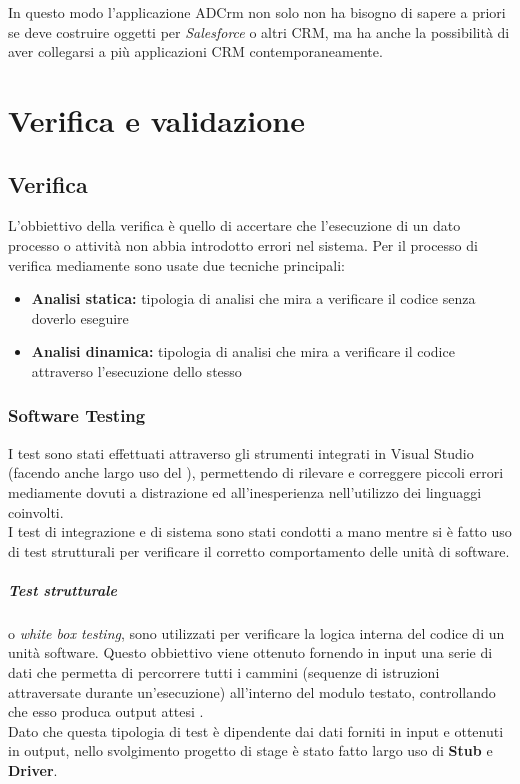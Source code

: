 \documentclass[12pt,a4paper,twoside,openany,english]{book}
\begin{document}
In questo modo l'applicazione ADCrm non solo non ha bisogno di sapere a priori se deve costruire oggetti per \textit{Salesforce} o altri \gls{CRM}, ma ha anche la possibilità di aver collegarsi a più applicazioni \gls{CRM} contemporaneamente.





\chapter{Verifica e validazione}\label{verifica_validazione}
\section{Verifica}
L'obbiettivo della verifica è quello di accertare che l'esecuzione di un dato processo o attività non abbia introdotto errori nel sistema.
Per il processo di verifica mediamente sono usate due tecniche principali:
\begin{itemize}
	\item \textbf{Analisi statica:} tipologia di analisi che mira a verificare il codice senza doverlo eseguire
	\item \textbf{Analisi dinamica:} tipologia di analisi che mira a verificare il codice attraverso l'esecuzione dello stesso
\end{itemize}

\subsection{Software Testing}
I test sono stati effettuati attraverso gli strumenti integrati in Visual Studio (facendo anche largo uso del \textit{}), permettendo di rilevare e correggere piccoli errori mediamente dovuti a distrazione ed all'inesperienza nell'utilizzo dei linguaggi coinvolti.\\
I test di integrazione e di sistema sono stati condotti a mano mentre si è fatto uso di test strutturali per verificare il corretto comportamento delle unità di software.

\paragraph{Test strutturale}
o \textit{white box testing}, sono utilizzati per verificare la logica interna del codice di un unità software. Questo obbiettivo viene ottenuto fornendo in input una serie di dati che permetta di percorrere tutti i cammini (sequenze di istruzioni attraversate durante un'esecuzione) all'interno del modulo testato, controllando che esso produca output attesi .\\
Dato che questa tipologia di test è dipendente dai dati forniti in input e ottenuti in output, nello svolgimento progetto di stage è stato fatto largo uso di \textbf{Stub} e \textbf{Driver}.
\end{document}
